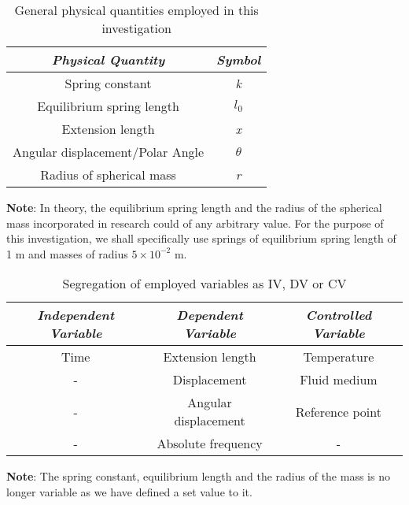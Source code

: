 \begin{table}[H]
    \centering
        \begin{tabular}{|c|c|}
        \hline
        \hline
        \textit{Physical Quantity} & \textit{Symbol} \\
        \hline
        \hline
        {Spring constant} & \textit{k} \\
        \hline
        {Equilibrium spring length} & \textit{$l_0$} \\
        \hline
        {Extension length} & \textit{x} \\
        \hline
        {Angular displacement/Polar Angle} & \textit{$\theta$} \\
        \hline
        {Radius of spherical mass} & \textit{r} \\
        \hline
        \hline
        \end{tabular}
    \caption{{General physical quantities employed in this investigation}}
\end{table}

{\textbf{Note}: In theory, the equilibrium spring length and the radius of the spherical mass incorporated in research could of any arbitrary value. For the purpose of this investigation, we shall specifically use springs of equilibrium spring length of 1 m and masses of radius $5\times10^{-2}$ m.}

\begin{table}[H]
    \centering
        \begin{tabular}{|c|c|c|}
        \hline
        \hline
        \textit{Independent Variable} & \textit{Dependent Variable} & \textit{Controlled Variable} \\
        \hline
        \hline
        {Time} & {Extension length} & {Temperature} \\
        \hline
        {-} & {Displacement} & {Fluid medium} \\
        \hline
        {-} & {Angular displacement} & {Reference point} \\
        \hline
        {-} & {Absolute frequency} & {-} \\
        \hline
        \hline
        \end{tabular}
    \caption{{Segregation of employed variables as IV, DV or CV}}
\end{table}

{\textbf{Note}: The spring constant, equilibrium length and the radius of the mass is no longer variable as we have defined a set value to it.}

